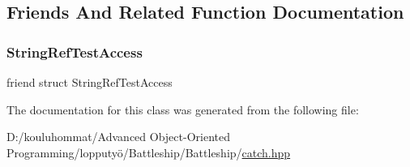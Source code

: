 \subsection{Friends And Related Function Documentation}
\mbox{\label{class_catch_1_1_string_ref_a420e64e1652de1b0d427775781b018f5}} 
\subsubsection{\texorpdfstring{String\+Ref\+Test\+Access}{StringRefTestAccess}}
{\footnotesize\ttfamily friend struct String\+Ref\+Test\+Access\hspace{0.3cm}{\ttfamily [friend]}}



The documentation for this class was generated from the following file\+:\begin{DoxyCompactItemize}
\item 
D\+:/kouluhommat/\+Advanced Object-\/\+Oriented Programming/lopputyö/\+Battleship/\+Battleship/\mbox{\hyperlink{catch_8hpp}{catch.\+hpp}}\end{DoxyCompactItemize}

